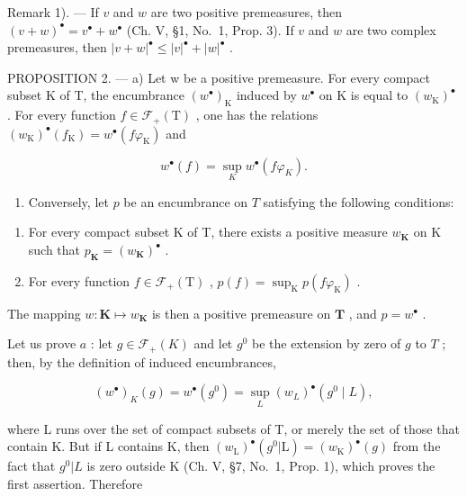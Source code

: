 Remark 1). --- If \(v\) and \(w\) are two positive premeasures, then \((v + w)^{\bullet} = v^{\bullet} + w^{\bullet}\) (Ch. V, §1, No.~1, Prop. 3). If \(v\) and \(w\) are two complex premeasures, then \(|v + w|^{\bullet} \leqslant |v|^{\bullet} + |w|^{\bullet}\) .

PROPOSITION 2. --- a) Let w be a positive premeasure. For every compact subset K of T, the encumbrance \((w^{\bullet})_{\mathrm{K}}\) induced by \(w^{\bullet}\) on K is equal to \((w_{\mathrm{K}})^{\bullet}\) . For every function \(f \in \mathcal{F}_{+}(\mathrm{T})\) , one has the relations \((w_{\mathrm{K}})^{\bullet}(f_{\mathrm{K}}) = w^{\bullet}(f\varphi_{\mathrm{K}})\) and

\[
w ^ {\bullet} (f) = \sup _ {K} w ^ {\bullet} (f \varphi_ {K}).\tag{2}
\]

\begin{enumerate}
\def\labelenumi{\alph{enumi})}
\setcounter{enumi}{1}
\tightlist
\item
  Conversely, let \(p\) be an encumbrance on \(T\) satisfying the following conditions:
\end{enumerate}

\begin{enumerate}
\def\labelenumi{\arabic{enumi})}
\item
  For every compact subset K of T, there exists a positive measure \(w_{\mathbf{K}}\) on K such that \(p_{\mathbf{K}} = (w_{\mathbf{K}})^{\bullet}\) .
\item
  For every function \(f \in \mathcal{F}_{+}(\mathrm{T})\) , \(p(f) = \sup_{\mathrm{K}} p(f\varphi_{\mathrm{K}})\) .
\end{enumerate}

The mapping \(w: \mathbf{K} \mapsto w_{\mathbf{K}}\) is then a positive premeasure on \(\mathbf{T}\) , and \(p = w^{\bullet}\) .

Let us prove \(a\) : let \(g \in \mathcal{F}_{+}(K)\) and let \(g^{0}\) be the extension by zero of \(g\) to \(T\) ; then, by the definition of induced encumbrances,

\[
(w ^ {\bullet}) _ {K} (g) = w ^ {\bullet} \left(g ^ {0}\right) = \sup _ {L} \left(w _ {L}\right) ^ {\bullet} \left(g ^ {0} \mid L\right),
\]

where L runs over the set of compact subsets of T, or merely the set of those that contain K. But if L contains K, then \((w_{\mathrm{L}})^{\bullet}(g^{0}|\mathrm{L})=(w_{\mathrm{K}})^{\bullet}(g)\) from the fact that \(g^{0}|L\) is zero outside K (Ch. V, §7, No.~1, Prop. 1), which proves the first assertion. Therefore

